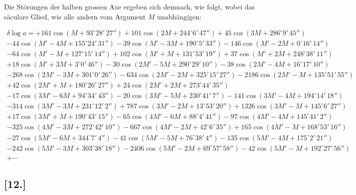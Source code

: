 \documentclass[12pt,a4paper]{article}
\begin{document}
Die Störungen der halben grossen Axe ergeben sich demnach, wie folgt, wobei das säculare Glied, wie alle andern vom Argument $M$ unabhängigen:

\begin{multline*}
\delta \log a = +161 \cos(M + 93^{\circ} 28'\, 27'') + 101 \cos(2M + 244^{\circ} 6'\, 47'') + 45 \cos(3M + 286^{\circ} 9'\, 45'')\\
- 44 \cos(M' - 4M + 155^{\circ} 24'\, 31'') - 39 \cos(M' - 3M + 190^{\circ} 5'\, 33'') - 146 \cos(M' - 2M + 0^{\circ} 16'\, 14'')\\
- 64 \cos(M' - M + 127^{\circ} 15'\, 14'') + 102 \cos(M' + M + 131^{\circ} 53'\, 19'') + 37 \cos(M' + 2M + 248^{\circ} 38'\, 11'')\\
+ 18 \cos(M' + 3M + 3^{\circ} 0'\, 46'') - 30 \cos(2M' - 5M + 290^{\circ} 29'\, 10'') - 38 \cos(2M' - 4M + 16^{\circ} 17'\, 10'')\\
- 268 \cos(2M' - 3M + 301^{\circ} 0'\, 26'') - 634 \cos(2M' - 2M + 325^{\circ} 15'\, 27'') - 2186 \cos(2M' - M + 135^{\circ} 51'\, 55'')\\
+ 42 \cos(2M' + M + 180^{\circ} 26'\, 27'') + 24 \cos(2M' + 2M + 273^{\circ} 44'\, 35'')\\
- 17 \cos(3M' - 6M + 94^{\circ} 34'\, 43'') - 20 \cos(3M' - 5M + 230^{\circ} 41'\, 7'') - 141 \cos(3M' - 4M + 194^{\circ} 14'\, 18'')\\
- 314 \cos(3M' - 3M + 231^{\circ} 12'\, 2'') + 787 \cos(3M' - 2M + 13^{\circ} 53'\, 20'') + 1326 \cos(3M' - M + 145^{\circ} 6'\, 27'')\\
+ 17 \cos(3M' + M + 190^{\circ} 43'\, 15'') - 65 \cos(4M' - 6M + 88^{\circ} 4'\, 41'') - 97 \cos(4M' - 4M + 145^{\circ} 41'\, 2'')\\
- 325 \cos(4M' - 3M + 272^{\circ} 42'\, 10'') - 667 \cos(4M' - 2M + 42^{\circ} 6'\, 35'') + 165 \cos(4M' - M + 168^{\circ} 53'\, 16'')\\
- 27 \cos(5M' - 6M + 344^{\circ} 7'\, 4'') - 41 \cos(5M' - 5M + 76^{\circ} 38'\, 4'') - 135 \cos(5M' - 4M + 175^{\circ} 2'\, 21'')\\
- 242 \cos(5M' - 3M + 303^{\circ} 38'\, 18'') - 2406 \cos(5M' - 2M + 69^{\circ} 57'\, 58'') - 42 \cos(5M' - M + 192^{\circ} 27'\, 56'')\\
+ \cdots
\end{multline*}

\subsection*{[12.]}
\end{document}
